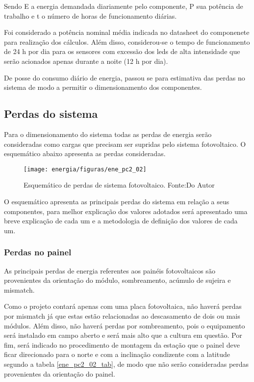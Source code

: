 Sendo E a energia demandada diariamente pelo componente, P sua potência de trabalho e t o número de horas de funcionamento diárias.

Foi considerado a potência nominal média indicada no datasheet do componenete para realização dos cálculos. Além disso, considerou-se o tempo de funcionamento de 24 h por dia para os sensores com excessão dos leds de alta intensidade que serão acionados apenas durante a noite (12 h por dia).  

De posse do consumo diário de energia, passou se para estimativa das perdas no sistema de modo a permitir o dimensionamento dos componentes.

\subsection{Perdas do sistema}

Para o dimensionamento do sistema todas as perdas de energia serão consideradas como cargas que precisam ser supridas pelo sistema fotovoltaico. O esquemático abaixo apresenta as perdas consideradas.

\begin{figure}[H]
		\centering
		\texttt{[image: energia/figuras/ene\_pc2\_02]}
		\caption{Esquemático de perdas de sistema fotovoltaico. Fonte:Do Autor}
		\label{ene_pc2_02}
\end{figure}

O esquemático apresenta as principais perdas do sistema em relação a seus componentes, para melhor explicação dos valores adotados será apresentado uma breve explicação de cada um e a metodologia de definição dos valores de cada um.

\subsubsection{Perdas no painel}

As principais perdas de energia referentes aos painéis fotovoltaicos são provenientes da orientação do módulo, sombreamento, acúmulo de sujeira e mismatch.
 
Como o projeto contará apenas com uma placa fotovoltaica, não haverá perdas por mismatch já que estas estão relacionadas ao descasamento de dois ou mais módulos. Além disso, não haverá perdas por sombreamento, pois o equipamento será instalado em campo aberto e será mais alto que a cultura em questão. Por fim, será indicado no procedimento de montagem da estação que o painel deve ficar direcionado para o norte e com a inclinação condizente com a latitude segundo a tabela \ref{ene_pc2_02_tab}, de modo que não serão consideradas perdas provenientes da orientação do painel.

